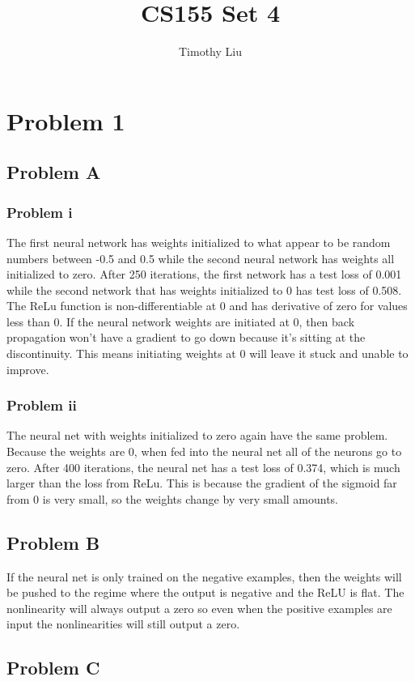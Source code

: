\documentclass[12pt]{article} %
\title{CS155 Set 4}
\author{Timothy Liu}
\begin{document}
\maketitle
\newpage
\section{Problem 1}

\subsection{Problem A}
\subsubsection{Problem i}
The first neural network has weights initialized to what appear to be random numbers between -0.5 and 0.5 while the second neural network has weights all initialized to zero. After 250 iterations, the first network has a test loss of 0.001 while the second network that has weights initialized to 0 has test loss of 0.508. The ReLu function is non-differentiable at 0 and has derivative of zero for values less than 0. If the neural network weights are initiated at 0, then back propagation won't have a gradient to go down because it's sitting at the discontinuity. This means initiating weights at 0 will leave it stuck and unable to improve.

\subsubsection{Problem ii}
The neural net with weights initialized to zero again have the same problem. Because the weights are 0, when fed into the neural net all of the neurons go to zero. After 400 iterations, the neural net has a test loss of 0.374, which is much larger than the loss from ReLu. This is because the gradient of the sigmoid far from 0 is very small, so the weights change by very small amounts.

\subsection{Problem B}
If the neural net is only trained on the negative examples, then the weights will be pushed to the regime where the output is negative and the ReLU is flat. The nonlinearity will always output a zero so even when the positive examples are input the nonlinearities will still output a zero.


\subsection{Problem C}
\end{document}
